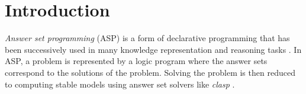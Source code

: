 \section{Introduction} 

	\emph{Answer set programming} (ASP) is a form of declarative programming that has been successively used in many knowledge representation and
	reasoning tasks \cite{DBLP:journals/amai/Niemela99,Baral03,DBLP:conf/iclp/Baral08}.
	In ASP, a problem is represented by a logic program where the answer sets correspond to the solutions of the problem.
	Solving the problem is then reduced to computing stable models using answer set solvers like \emph{clasp} \cite{DBLP:conf/lpnmr/GebserKNS07a,gebser2008user}.
